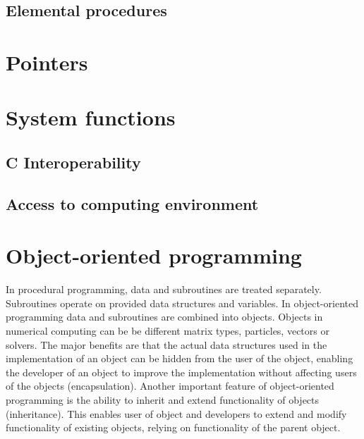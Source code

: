 \subsection{Elemental procedures}


\section{Pointers}


\section{System functions}

\subsection{C Interoperability}


\subsection{Access to computing environment}

\section{Object-oriented programming}

In procedural programming, data and subroutines are treated separately. Subroutines operate on provided data structures and variables. In object-oriented programming data and subroutines are combined into objects. Objects in numerical computing can be  be different matrix types, particles, vectors or solvers. The major benefits are that the actual data structures used in the implementation of an object can be hidden from the user of the object, enabling the developer of an object to improve the implementation without affecting users of the objects (encapsulation). Another important feature of object-oriented programming is the ability to inherit and extend functionality of objects (inheritance). This enables user of object and developers to extend and modify functionality of existing objects, relying on functionality of the parent object.

